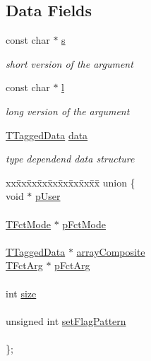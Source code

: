 \subsection*{Data Fields}
\begin{CompactItemize}
\item 
const char $\ast$ \hyperlink{structArgDef__t_4ca9eeaa97d70754a94cb018d13f21cd}{s}
\begin{CompactList}\small\item\em short version of the argument \item\end{CompactList}\item 
const char $\ast$ \hyperlink{structArgDef__t_c076508155e43ccd57ed2f6c871a107d}{l}
\begin{CompactList}\small\item\em long version of the argument \item\end{CompactList}\item 
\hyperlink{structTaggedData__t}{TTagged\-Data} \hyperlink{structArgDef__t_75389251964258516f1e52fb06df857b}{data}
\begin{CompactList}\small\item\em type dependend data structure \item\end{CompactList}\item 
\begin{tabbing}
xx\=xx\=xx\=xx\=xx\=xx\=xx\=xx\=xx\=\kill
union \{\\
\>void $\ast$ \hyperlink{structArgDef__t_8705bbfe111541c0184b61a058ddccb1}{pUser}\\
\>\\\>\hyperlink{structFctMode__t}{TFctMode} $\ast$ \hyperlink{structArgDef__t_f0e262a888279888219539148e30391b}{pFctMode}\\
\>\\\>\hyperlink{structTaggedData__t}{TTaggedData} $\ast$ \hyperlink{structArgDef__t_a1d8173daa98a2ba54340e7e6a29db2e}{arrayComposite}\\
\>\hyperlink{structFctArg__t}{TFctArg} $\ast$ \hyperlink{structArgDef__t_0b8bf4785dab58cdbf9124f23cf6346f}{pFctArg}\\
\>\>\\\>int \hyperlink{structArgDef__t_6dc5a1f0d48c5a90e40304930d77a0e2}{size}\\
\>\\\>unsigned int \hyperlink{structArgDef__t_fbd0df81e0a7ea0c1a62a3d1e2680d14}{setFlagPattern}\\
\>\\\}; \\


\end{tabbing}
\end{CompactItemize}
